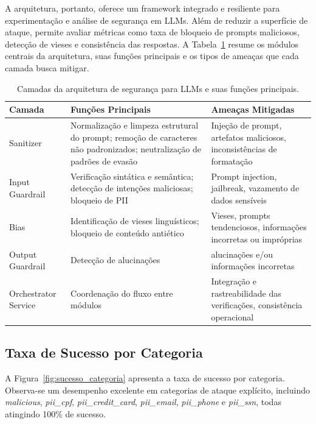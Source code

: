 A arquitetura, portanto, oferece um framework integrado e resiliente para experimentação e análise de segurança em LLMs. Além de reduzir a superfície de ataque, permite avaliar métricas como taxa de bloqueio de prompts maliciosos, detecção de vieses e consistência das respostas. A Tabela~\ref{tab:architecture_layers} resume os módulos centrais da arquitetura, suas funções principais e os tipos de ameaças que cada camada busca mitigar.

\begin{table}[ht!]
\centering
\caption{Camadas da arquitetura de segurança para LLMs e suas funções principais.}
\label{tab:architecture_layers}
\begin{tabularx}{\textwidth}{>{\raggedright\arraybackslash}p{} X X}
\toprule
\textbf{Camada} & \textbf{Funções Principais} & \textbf{Ameaças Mitigadas} \\
\midrule
Sanitizer 
& Normalização e limpeza estrutural do prompt; remoção de caracteres não padronizados; neutralização de padrões de evasão 
& Injeção de prompt, artefatos maliciosos, inconsistências de formatação \\
\midrule
Input Guardrail & Verificação sintática e semântica; detecção de intenções maliciosas; bloqueio de PII & Prompt injection, jailbreak, vazamento de dados sensíveis \\
\midrule
Bias & Identificação de vieses linguísticos; bloqueio de conteúdo antiético & Vieses, prompts tendenciosos, informações incorretas ou impróprias \\
\midrule
Output Guardrail & Detecção de alucinações & alucinações e/ou informações incorretas \\
\midrule
Orchestrator Service & Coordenação do fluxo entre módulos & Integração e rastreabilidade das verificações, consistência operacional \\
\bottomrule
\end{tabularx}
\end{table}

\subsection{Taxa de Sucesso por Categoria}

A Figura~\ref{fig:sucesso_categoria} apresenta a taxa de sucesso por categoria. Observa-se um desempenho excelente em categorias de ataque explícito, incluindo \textit{malicious}, \textit{pii\_cpf}, \textit{pii\_credit\_card}, \textit{pii\_email}, \textit{pii\_phone} e \textit{pii\_ssn}, todas atingindo 100\% de sucesso.

